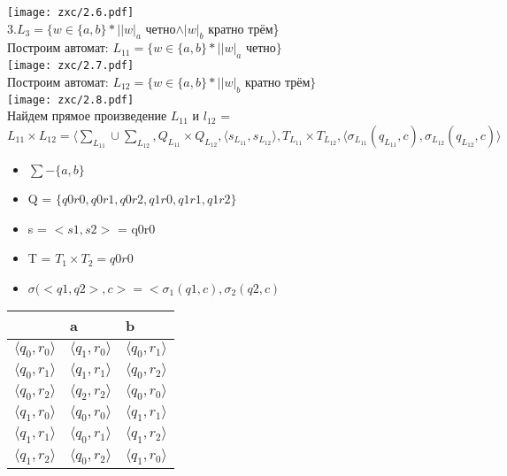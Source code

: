 \documentclass{article}
\begin{document}
  \texttt{[image: zxc/2.6.pdf]}\\
    $3. L_3 = \{w \in \{a,b\} * ||w|_a$ четно$ \wedge |w|_b $ кратно трём\}\\
  Построим автомат: $L_{11} = \{w \in \{a,b\} * ||w|_a$ четно$ \}$\\
    \texttt{[image: zxc/2.7.pdf]}\\
  Построим автомат: $L_{12} = \{w \in \{a,b\} * ||w|_b$ кратно трём$\}$ \\
     \texttt{[image: zxc/2.8.pdf]}\\
    Найдем прямое произведение $L_{11}$ и $l_{12}$ = 
  $L_{11}\times L_{12}=\langle \sum_L_{11}\cup\sum_L_{12}, Q_L_{11}\times Q_L_{12}, \langle s_L_{11},s_L_{12}\rangle, T_L_{11}\times T_L_{12}, \langle\sigma_L_{11}(q_L_{11},c),\sigma_L_{12}(q_L_{12},c) \rangle$
  \begin{itemize}
      \item $\sum - \{a,b\}$\\
      \item Q = $\{q0r0,q0r1,q0r2,q1r0,q1r1,q1r2\}$\\
      \item s = $<s1,s2>$ = q0r0\\
      \item T = $T_1 \times T_2 = q0r0 $\\
      \item $\sigma(<q1,q2>,c> =  < \sigma_1(q1,c),\sigma_2(q2,c)$\\
  \end{itemize}
			\begin{tabular}{ | l | l | l | }
				\hline
				& a & b \\ \hline
				$\langle q_0,r_0\rangle$ & $\langle q_1,r_0\rangle$ & $\langle q_0,r_1\rangle$ \\
				$\langle q_0,r_1\rangle$ & $\langle q_1,r_1\rangle$ & $\langle q_0,r_2\rangle$ \\
				$\langle q_0,r_2\rangle$ & $\langle q_2,r_2\rangle$ & $\langle q_0,r_0\rangle$ \\
				$\langle q_1,r_0\rangle$ & $\langle q_0,r_0\rangle$ & $\langle q_1,r_1\rangle$ \\
				$\langle q_1,r_1\rangle$ & $\langle q_0,r_1\rangle$ & $\langle q_1,r_2\rangle$ \\
				$\langle q_1,r_2\rangle$ & $\langle q_0,r_2\rangle$ & $\langle q_1,r_0\rangle$ \\
				\hline
			\end{tabular}\\
\end{document}
